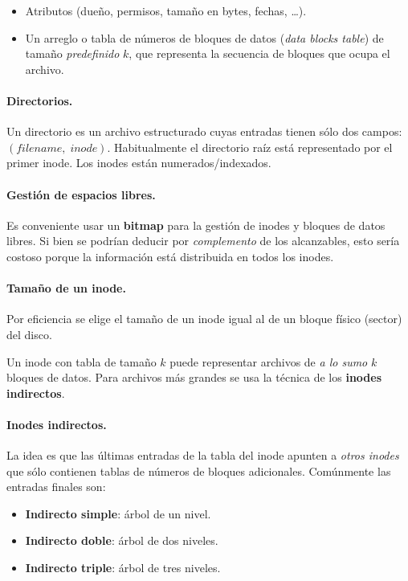 \documentclass[11pt,a4paper]{article}
\begin{document}
\begin{itemize}[leftmargin=*,nosep]
    \item Atributos (dueño, permisos, tamaño en bytes, fechas, \ldots).
    \item Un arreglo o tabla de números de bloques de datos
        (\emph{data blocks table}) de tamaño \emph{predefinido} $k$,
        que representa la secuencia de bloques que ocupa el archivo.
\end{itemize}

\paragraph{Directorios.}
Un directorio es un archivo estructurado cuyas entradas tienen sólo
dos campos: $(\textit{filename},\;\textit{inode})$. Habitualmente el
directorio raíz está representado por el primer inode. Los inodes
están numerados/indexados.

\paragraph{Gestión de espacios libres.}
Es conveniente usar un \textbf{bitmap} para la gestión de inodes y
bloques de datos libres. Si bien se podrían deducir por
\emph{complemento} de los alcanzables, esto sería costoso porque la
información está distribuida en todos los inodes.

\paragraph{Tamaño de un inode.}
Por eficiencia se elige el tamaño de un inode igual al de un bloque
físico (sector) del disco.

\begin{importante}
Un inode con tabla de tamaño $k$ puede representar archivos de \emph{a
lo sumo} $k$ bloques de datos. Para archivos más grandes se usa la
técnica de los \textbf{inodes indirectos}.
\end{importante}

\paragraph{Inodes indirectos.}
La idea es que las últimas entradas de la tabla del inode apunten a
\emph{otros inodes} que sólo contienen tablas de números de bloques
adicionales. Comúnmente las entradas finales son:

\begin{itemize}[leftmargin=*,nosep]
    \item \textbf{Indirecto simple}: árbol de un nivel.
    \item \textbf{Indirecto doble}: árbol de dos niveles.
    \item \textbf{Indirecto triple}: árbol de tres niveles.
\end{itemize}
\end{document}
